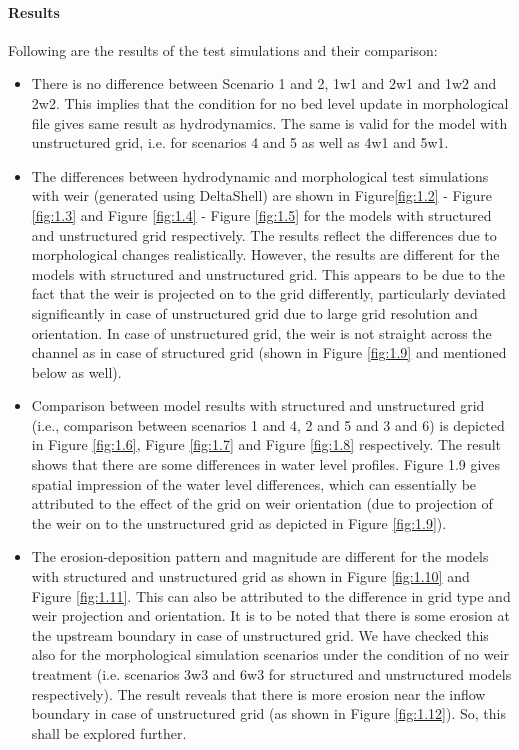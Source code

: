 \paragraph*{Results}
Following are the results of the test simulations and their comparison:

\begin{itemize}

\item	There is no difference between Scenario 1 and 2, 1w1 and 2w1 and 1w2 and 2w2. This implies that the condition for no bed level update in morphological file gives same result as hydrodynamics. The same is valid for the model with unstructured grid, i.e. for scenarios 4 and 5 as well as 4w1 and 5w1. 
\item	The differences between hydrodynamic and morphological test simulations with weir (generated using DeltaShell) are shown in Figure\ref{fig:1.2} - Figure \ref{fig:1.3} and Figure \ref{fig:1.4} - Figure \ref{fig:1.5}  for the models with structured and unstructured grid respectively. The results reflect the differences due to morphological changes realistically. However, the results are different for the models with structured and unstructured grid. This appears to be due to the fact that the weir is projected on to the grid differently, particularly deviated significantly in case of unstructured grid due to large grid resolution and orientation. In case of unstructured grid, the weir is not straight across the channel as in case of structured grid (shown in Figure \ref{fig:1.9} and mentioned below as well).  
\item	Comparison between model results with structured and unstructured grid (i.e., comparison between scenarios 1 and 4, 2 and 5 and 3 and 6) is depicted in Figure \ref{fig:1.6}, Figure \ref{fig:1.7} and Figure \ref{fig:1.8} respectively. The result shows that there are some differences in water level profiles. Figure 1.9 gives spatial impression of the water level differences, which can essentially be attributed to the effect of the grid on weir orientation (due to projection of the weir on to the unstructured grid as depicted in Figure \ref{fig:1.9}). 
\item	The erosion-deposition pattern and magnitude are different for the models with structured and unstructured grid as shown in Figure \ref{fig:1.10} and Figure \ref{fig:1.11}. This can also be attributed to the difference in grid type and weir projection and orientation. It is to be noted that there is some erosion at the upstream boundary in case of unstructured grid. We have checked this also for the morphological simulation scenarios under the condition of no weir treatment (i.e. scenarios 3w3 and 6w3 for structured and unstructured models respectively). The result reveals that there is more erosion near the inflow boundary in case of unstructured grid (as shown in Figure \ref{fig:1.12}). So, this shall be explored further.   

\end{itemize}
